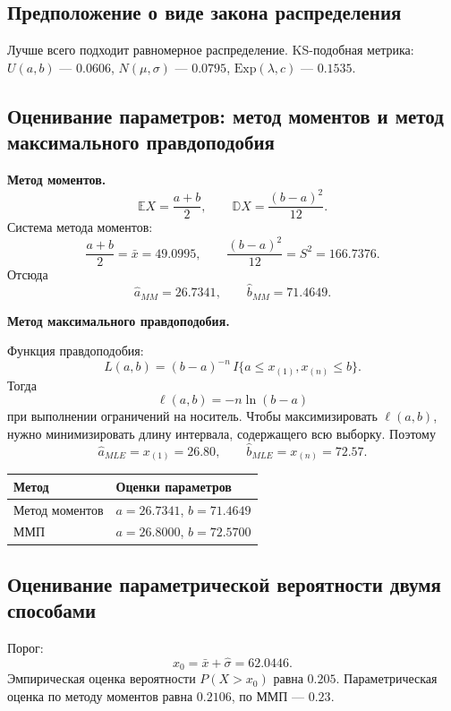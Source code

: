 \documentclass[12pt,a4paper]{article}
\begin{document}
\subsection{Предположение о виде закона распределения}

Лучше всего подходит равномерное распределение. KS-подобная метрика: $U(a,b)$ --- $0.0606$, $N(\mu,\sigma)$ --- $0.0795$, $\mathrm{Exp}(\lambda,c)$ --- $0.1535$.

\subsection{Оценивание параметров: метод моментов и метод максимального правдоподобия}

\textbf{Метод моментов.}
\[
\mathbb{E}X = \frac{a+b}{2}, \qquad \mathbb{D}X = \frac{(b-a)^2}{12}.
\]
Система метода моментов:
\[
\frac{a+b}{2} = \bar{x} = 49.0995, \qquad \frac{(b-a)^2}{12} = S^2 = 166.7376.
\]
Отсюда
\[
\hat{a}_{MM} = 26.7341, \qquad \hat{b}_{MM} = 71.4649.
\]

\textbf{Метод максимального правдоподобия.}

Функция правдоподобия:
\[
L(a,b) = (b-a)^{-n}\, I\{a \le x_{(1)}, x_{(n)} \le b\}.
\]
Тогда
\[
\ell(a,b) = -n \ln(b-a)
\]
при выполнении ограничений на носитель. Чтобы максимизировать $\ell(a,b)$, нужно минимизировать длину интервала, содержащего всю выборку. Поэтому
\[
\hat{a}_{MLE} = x_{(1)} = 26.80, \qquad \hat{b}_{MLE} = x_{(n)} = 72.57.
\]

\begin{center}
\begin{tabular}{>{\raggedright\arraybackslash}p{}p{}}
\toprule
Метод & Оценки параметров \\
\midrule
Метод моментов & $a = 26.7341$, $b = 71.4649$ \\
ММП & $a = 26.8000$, $b = 72.5700$ \\
\bottomrule
\end{tabular}
\end{center}

\subsection{Оценивание параметрической вероятности двумя способами}

Порог:
\[
x_0 = \bar{x} + \hat{\sigma} = 62.0446.
\]
Эмпирическая оценка вероятности $P(X > x_0)$ равна $0.205$. Параметрическая оценка по методу моментов равна $0.2106$, по ММП --- $0.23$.
\end{document}
